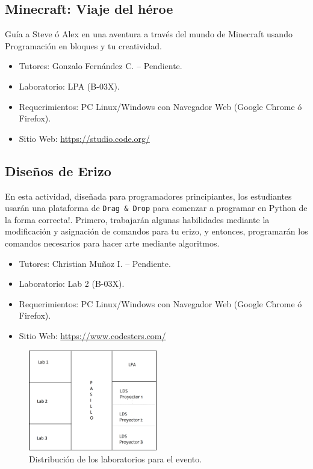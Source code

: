 \documentclass[letterpaper,12pt]{article}
\begin{document}
\subsection{Minecraft: Viaje del héroe}

Guía a Steve ó Alex en una aventura a través del mundo de Minecraft usando Programación en bloques y tu creatividad.

\begin{itemize}
    \item Tutores: Gonzalo Fernández C. -- Pendiente.
    \item Laboratorio: LPA (B-03X).
    \item Requerimientos: PC Linux/Windows con Navegador Web (Google Chrome ó Firefox).
    \item Sitio Web: \href{https://studio.code.org/s/hero/stage/1/puzzle/1}{https://studio.code.org/}
\end{itemize}

\subsection{Diseños de Erizo}

En esta actividad, diseñada para programadores principiantes, los estudiantes usarán una plataforma de \texttt{Drag \& Drop} para comenzar a programar en Python de la forma correcta!. Primero, trabajarán algunas habilidades mediante la modificación y asignación de comandos para tu erizo, y entonces, programarán los comandos necesarios para hacer arte mediante algoritmos. 

\begin{itemize}
    \item Tutores: Christian Muñoz I. -- Pendiente.
    \item Laboratorio: Lab 2 (B-03X).
    \item Requerimientos: PC Linux/Windows con Navegador Web (Google Chrome ó Firefox).
    \item Sitio Web: \href{https://www.codesters.com/curriculum/hour-of-code-2017/Dise%25C3%25B1os+de+Erizo/23/}{https://www.codesters.com/}
\end{itemize}

\begin{figure}[H]
  \centering
    \includegraphics[width=0.5\textwidth]{salas}
  \caption{Distribución de los laboratorios para el evento.}
\end{figure}
\end{document}
